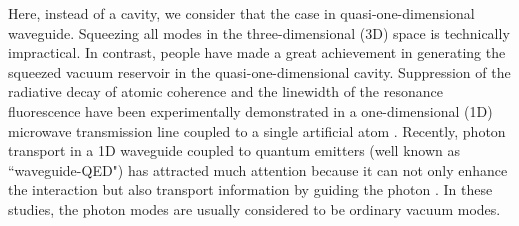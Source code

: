 \documentclass[aps,showpacs,twocolumn,twoside,groupedaddress]{revtex4}
\begin{document}
Here, instead of a cavity, we consider that the case in quasi-one-dimensional waveguide. Squeezing all modes in the three-dimensional (3D) space is technically impractical. In contrast, people have made a great achievement in generating the squeezed vacuum reservoir in the quasi-one-dimensional cavity.  Suppression of the radiative decay of atomic coherence and the linewidth of the resonance fluorescence have been experimentally demonstrated in a  one-dimensional (1D) microwave transmission line coupled to a single artificial atom  \cite{turchette1998qa, murch2013kw, toyli2016resonance, bergeal2010analog, wang2018cavity, qin2018exponentially}. Recently, photon transport in a 1D waveguide coupled to quantum emitters (well known as ``waveguide-QED") has attracted much attention because it can not only enhance the interaction but also transport information by guiding the photon \cite{shen2005coherent, shen2007strongly, yudson2008multiphoton, liao2015single, liao2016dynamical, liao2016review, roy2017review}. In these studies, the photon modes are usually considered to be ordinary vacuum modes.   %



\end{document}
